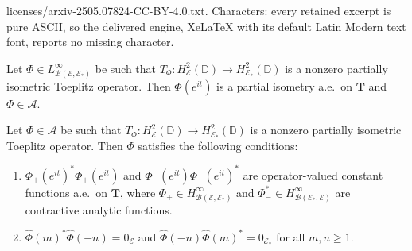 \documentclass[10pt,a4paper]{amsart}
\newcommand{\D}{\mathbb{D}}
\newcommand{\T}{\bm{T}}
\newcommand{\cla}{\mathcal{A}}
\newcommand{\clb}{\mathcal{B}}
\newcommand{\cle}{\mathcal{E}}
\begin{document}
licenses/arxiv-2505.07824-CC-BY-4.0.txt. Characters: every retained excerpt is pure ASCII, so the delivered engine, XeLaTeX with its default Latin Modern text font, reports no missing character.
\begin{lem}\label{NC1}
Let $\Phi \in L^\infty_{\clb(\cle,\cle_*)}$ be such that $T_\Phi: H^2_\cle(\D) \rightarrow H^2_{\cle_*}(\D)$ is a nonzero partially isometric Toeplitz operator. Then $\Phi(e^{it})$ is a partial isometry a.e.\ on $\T$ and $\Phi \in \cla.$
\end{lem}

\begin{prop}\label{NC}
Let $\Phi \in \cla$ be such that $T_\Phi: H^2_\cle(\D) \rightarrow H^2_{\cle_*}(\D)$ is a nonzero partially isometric Toeplitz operator. Then $\Phi$ satisfies the following conditions:
\begin{enumerate}
\item  $\Phi_+(e^{it})^*\Phi_+(e^{it}) $ and $\Phi_-(e^{it})\Phi_-(e^{it})^*$
 are  operator-valued constant functions a.e.\ on $\T$, where $\Phi_+ \in H^\infty_{\clb(\cle,\cle_*)}$ and $\Phi_-^* \in H^\infty_{\clb(\cle_*,\cle)}$ are contractive analytic functions. \label{con1} 
\item $\hat{\Phi}(m)^*\hat{\Phi}(-n)=0_\cle$ and $\hat{\Phi}(-n)\hat{\Phi}(m)^*=0_{\cle_*}$ for all $m,n \geq 1$.
\label{con2}
\end{enumerate}
\end{prop}
\end{document}
